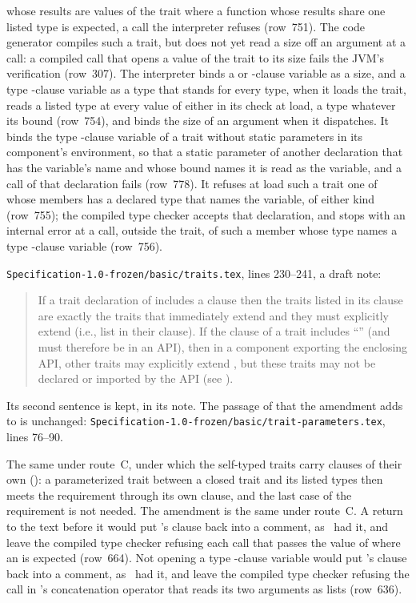 \begin{description}
whose results are values of the trait where a function whose results share
one listed type is expected, a call the interpreter refuses (row~751).
The code generator compiles such a trait, but does not yet read a size off an
argument at a call: a compiled call that opens a value of the trait to its
size fails the JVM's verification (row~307).
The interpreter binds a  or  -clause variable as a
size, and a type -clause variable as a type that stands for every
type, when it loads the trait, reads a listed type at every value of either in
its check at load, a type whatever its bound (row~754), and binds the size
of an argument when it dispatches.
It binds the type -clause variable of a trait without static
parameters in its component's environment, so that a static parameter of
another declaration that has the variable's name and whose bound names it
is read as the variable, and a call of that declaration fails (row~778).
It refuses at load such a trait one of whose members has a declared type that
names the variable, of either kind (row~755); the compiled type checker
accepts that declaration, and stops with an internal error at a call, outside
the trait, of such a member whose type names a type -clause variable
(row~756).
\item[Original text] \nolinkurl{Specification-1.0-frozen/basic/traits.tex},
lines 230--241, a draft note:
\begin{quote}
If a trait declaration of  includes a  clause
then the traits listed in its  clause
are exactly the traits that immediately extend 
and they must explicitly extend 
(i.e., list  in their  clause).
If the  clause of a trait  includes ``\EXP{\ldots}''
(and must therefore be in an API),
then in a component exporting the enclosing API,
other traits may explicitly extend ,
but these traits may not be declared or imported by the API
(see ).
\end{quote}
Its second sentence is kept, in its note.
The passage of  that the amendment adds to is unchanged:
\nolinkurl{Specification-1.0-frozen/basic/trait-parameters.tex}, lines 76--90.
\item[Route C] The same under route~C, under which the self-typed traits
carry  clauses of their own (): a
parameterized trait between a closed trait and its listed types then meets
the requirement through its own clause, and the last case of the
requirement is not needed.
The amendment is the same under route~C.
A return to the text before it would put 's clause back into a
comment, as \library\ had it, and leave the compiled type checker refusing
each call that passes the value of  where an
 is expected (row~664).
Not opening a type -clause variable would put 's
clause back into a comment, as \library\ had it, and leave the compiled type
checker refusing the call in 's concatenation operator that reads
its two arguments as lists (row~636).
\end{description}

